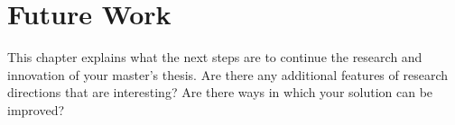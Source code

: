 \chapter*{Future Work}

This chapter explains what the next steps are to continue the research and innovation of your master's thesis. Are there any additional features of research directions that are interesting? Are there ways in which your solution can be improved?
